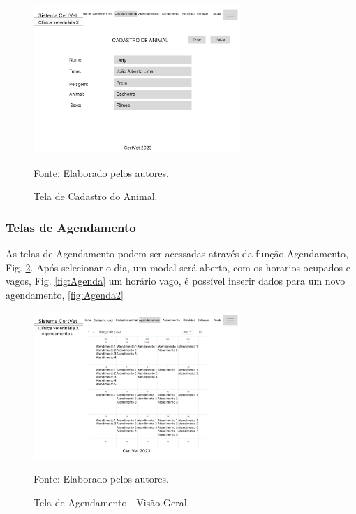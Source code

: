 \documentclass[
    12pt,               %
    openright,          %
    oneside,
    a4paper,            %
    BIBLATEX,           %
    TODO,               %
    english,            %
    brazil              %
    ]{ifsp-spo-inf-ctds}
\begin{document}
\begin{figure}[H]
                \centering
                \caption{Tela de Cadastro do Animal.}
                \includegraphics[width=0.7\textwidth]{images/Telas/Cadastro Animal.png}
                
                \label{fig:CadAnimal}
                \centering
        {\footnotesize Fonte: Elaborado pelos autores.}
            \end{figure}    

\subsubsection{Telas de Agendamento}

As telas de Agendamento podem ser acessadas através da função Agendamento, Fig. \ref{fig:Calendario}. Após selecionar o dia, um modal será aberto, com os horarios ocupados e vagos, Fig. \ref{fig:Agenda}  um horário vago, é possível inserir dados para um novo agendamento, \ref{fig:Agenda2}


\begin{figure}[H]
                \centering
                \caption{Tela de Agendamento - Visão Geral.}
                \includegraphics[width=0.7\textwidth]{images/Telas/Calendario Agenda.png}
                
                \label{fig:Calendario}
                \centering
        {\footnotesize Fonte: Elaborado pelos autores.}
            \end{figure}    
\end{document}
